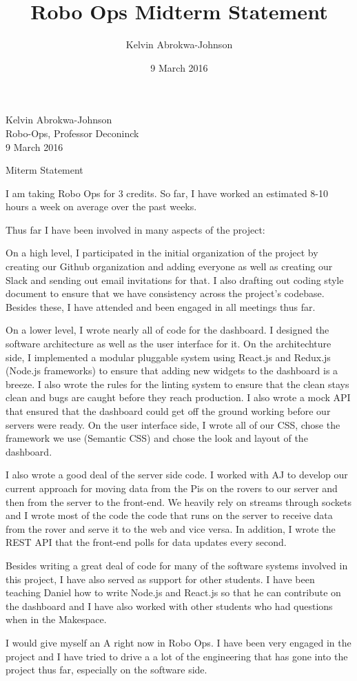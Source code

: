 \documentclass{article}
\title{Robo Ops Midterm Statement}
\author{Kelvin Abrokwa-Johnson}
\date{9 March 2016}
\begin{document}
\noindent Kelvin Abrokwa-Johnson \\
Robo-Ops, Professor Deconinck \\
9 March 2016
	
\begin{center}
Miterm Statement
\end{center}

I am taking Robo Ops for 3 credits. So far, I have worked an estimated 8-10 hours a week on average over the past weeks.

Thus far I have been involved in many aspects of the project:

On a high level, I participated in the initial organization of the project by creating our Github organization and adding everyone as well as creating our Slack and sending out email invitations for that. I also drafting out coding style document to ensure that we have consistency across the project's codebase. Besides these, I have attended and been engaged in all meetings thus far.

On a lower level, I wrote nearly all of code for the dashboard. I designed the software architecture as well as the user interface for it. On the architechture side, I implemented a modular pluggable system using React.js and Redux.js (Node.js frameworks) to ensure that adding new widgets to the dashboard is a breeze. I also wrote the rules for the linting system to ensure that the clean stays clean and bugs are caught before they reach production. I also wrote a mock API that ensured that the dashboard could get off the ground working before our servers were ready. On the user interface side, I wrote all of our CSS, chose the framework we use (Semantic CSS) and chose the look and layout of the dashboard.

I also wrote a good deal of the server side code. I worked with AJ to develop our current approach for moving data from the Pis on the rovers to our server and then from the server to the front-end. We heavily rely on streams through sockets and I wrote most of the code the code that runs on the server to receive data from the rover and serve it to the web and vice versa. In addition, I wrote the REST API that the front-end polls for data updates every second.

Besides writing a great deal of code for many of the software systems involved in this project, I have also served as support for other students. I have been teaching Daniel how to write Node.js and React.js so that he can contribute on the dashboard and I have also worked with other students who had questions when in the Makespace.

I would give myself an A right now in Robo Ops. I have been very engaged in the project and I have tried to drive a a lot of the engineering that has gone into the project thus far, especially on the software side.
\end{document}
